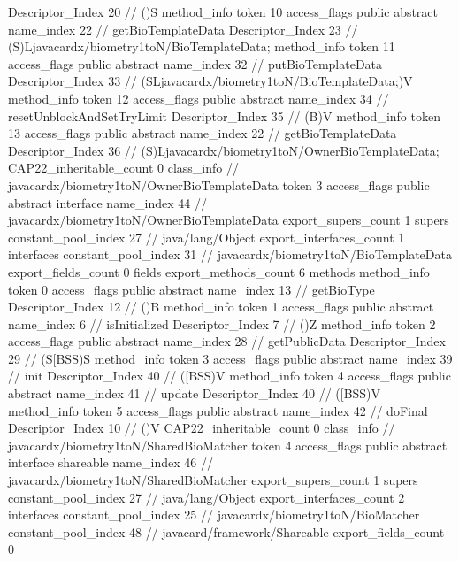 {{{{{					Descriptor_Index	20		// ()S
				}
				method_info {
					token	10
					access_flags	public abstract
					name_index	22		// getBioTemplateData
					Descriptor_Index	23		// (S)Ljavacardx/biometry1toN/BioTemplateData;
				}
				method_info {
					token	11
					access_flags	public abstract
					name_index	32		// putBioTemplateData
					Descriptor_Index	33		// (SLjavacardx/biometry1toN/BioTemplateData;)V
				}
				method_info {
					token	12
					access_flags	public abstract
					name_index	34		// resetUnblockAndSetTryLimit
					Descriptor_Index	35		// (B)V
				}
				method_info {
					token	13
					access_flags	public abstract
					name_index	22		// getBioTemplateData
					Descriptor_Index	36		// (S)Ljavacardx/biometry1toN/OwnerBioTemplateData;
				}
			}
			CAP22_inheritable_count	0
		}
		class_info {		// javacardx/biometry1toN/OwnerBioTemplateData
			token	3
			access_flags	public abstract interface
			name_index	44		// javacardx/biometry1toN/OwnerBioTemplateData
			export_supers_count	1
			supers {
				constant_pool_index	27		// java/lang/Object
			}
			export_interfaces_count	1
			interfaces {
				constant_pool_index	31		// javacardx/biometry1toN/BioTemplateData
			}
			export_fields_count	0
			fields {
			}
			export_methods_count	6
			methods {
				method_info {
					token	0
					access_flags	public abstract
					name_index	13		// getBioType
					Descriptor_Index	12		// ()B
				}
				method_info {
					token	1
					access_flags	public abstract
					name_index	6		// isInitialized
					Descriptor_Index	7		// ()Z
				}
				method_info {
					token	2
					access_flags	public abstract
					name_index	28		// getPublicData
					Descriptor_Index	29		// (S[BSS)S
				}
				method_info {
					token	3
					access_flags	public abstract
					name_index	39		// init
					Descriptor_Index	40		// ([BSS)V
				}
				method_info {
					token	4
					access_flags	public abstract
					name_index	41		// update
					Descriptor_Index	40		// ([BSS)V
				}
				method_info {
					token	5
					access_flags	public abstract
					name_index	42		// doFinal
					Descriptor_Index	10		// ()V
				}
			}
			CAP22_inheritable_count	0
		}
		class_info {		// javacardx/biometry1toN/SharedBioMatcher
			token	4
			access_flags	public abstract interface shareable
			name_index	46		// javacardx/biometry1toN/SharedBioMatcher
			export_supers_count	1
			supers {
				constant_pool_index	27		// java/lang/Object
			}
			export_interfaces_count	2
			interfaces {
				constant_pool_index	25		// javacardx/biometry1toN/BioMatcher
				constant_pool_index	48		// javacard/framework/Shareable
			}
			export_fields_count	0
}}}
